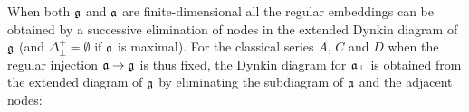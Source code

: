 \documentclass[12pt]{iopart}
\theoremstyle{definition}
\begin{document}
When both $\frak{g}$ and $\frak{a}$ are finite-dimensional all the regular
embeddings can be obtained by a successive elimination of nodes in the
extended Dynkin diagram of $\frak{g}$ (and $\Delta _{\bot }^{+}=\emptyset $
if $\frak{a}$ is maximal). For the classical series $A$, $C$ and $D$ when
the regular injection $\frak{a}\rightarrow \frak{g}$ is thus fixed, the
Dynkin diagram for $\frak{a}_{\bot }$ is obtained from the extended diagram
of $\frak{g}$ by eliminating the subdiagram of $\frak{a}$ and the adjacent
nodes:
\begin{table}[tbh]
\label{tab:diagrams} \noindent {}
\caption{Subalgebras $\frak{a},\;\frak{a}_{\bot }$ for the classical series}
\end{table}
\end{document}
